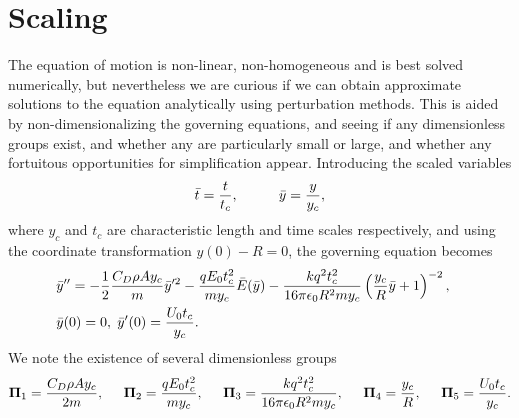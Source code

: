 \documentclass[12pt,a4paper,oneside]{book}
\begin{document}
\section{Scaling}
The equation of motion is non-linear, non-homogeneous and is best solved numerically, but nevertheless we are curious if we can obtain approximate solutions to the equation analytically using perturbation methods. This is aided by non-dimensionalizing the governing equations, and seeing if any dimensionless groups exist, and whether any are particularly small or large, and whether any fortuitous opportunities for simplification appear. Introducing the scaled variables
\begin{equation}
 \bar{t} = \frac{t}{t_c}, \hspace{10 mm} \bar{y} = \frac{y}{y_c}, \end{equation}
where $y_c$ and $t_c$ are characteristic length and time scales respectively, and using the coordinate transformation $y(0) - R = 0$, the governing equation becomes
\begin{eqnarray}
& \bar{y}'' = - \frac{1}{2} \frac{C_D \rho A y_c}{m} \bar{y}'^2
- \frac{q E_0 t_c^2}{m y_c} \bar{E} ( \bar{y} ) 
- \frac{k q^2 t_c^2}{16 \pi \epsilon_0 R^2 m y_c} \left( \frac{y_c}{R} \bar{y} + 1 \right)^{-2}, & \nonumber \\
& \bar{y}(0) = 0, \hspace{1 mm} \bar{y}'(0) = \frac{U_0 t_c}{y_c} .& \label{scaled_eqn}
\end{eqnarray}
We note the existence of several dimensionless groups
\[ \mathbf{\Pi}_1 = \frac{C_D \rho A y_c}{2 m}, \hspace{5 mm}
\mathbf{\Pi}_2 = \frac{q E_0 t_c^2}{m y_c}, \hspace{5 mm}
\mathbf{\Pi}_3 = \frac{k q^2 t_c^2}{16 \pi \epsilon_0 R^2 m y_c}, \hspace{5 mm}
\mathbf{\Pi}_4 = \frac{y_c}{R}, \hspace{5 mm}
\mathbf{\Pi}_5 = \frac{U_0 t_c}{y_c}.\]
\end{document}
